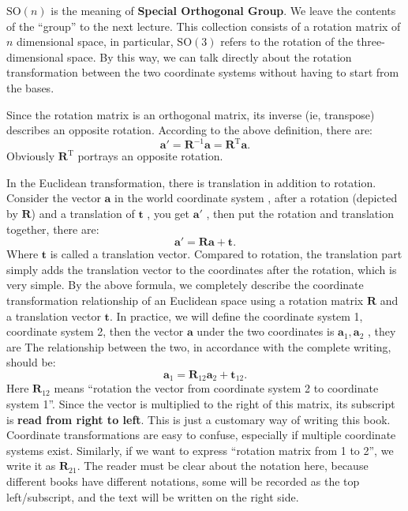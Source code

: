 $\mathrm{SO}(n) $ is the meaning of \textbf {Special Orthogonal Group}. We leave the contents of the ``group'' to the next lecture. This collection consists of a rotation matrix of $ n $ dimensional space, in particular, $\mathrm {SO}(3)$ refers to the rotation of the three-dimensional space. By this way, we can talk directly about the rotation transformation between the two coordinate systems without having to start from the bases.

Since the rotation matrix is an orthogonal matrix, its inverse (ie, transpose) describes an opposite rotation. According to the above definition, there are:
\begin{equation}
\mathbf{a} '= \mathbf{R}^{-1} \mathbf{a} = \mathbf{R}^ \mathrm{T} \mathbf{a}.
\end{equation}
Obviously $ \mathbf{R}^\mathrm{T} $ portrays an opposite rotation.

In the Euclidean transformation, there is translation in addition to rotation. Consider the vector $ \mathbf{a} $ in the world coordinate system , after a rotation (depicted by $ \mathbf{R} $) and a translation of $ \mathbf{t} $ , you get $ \mathbf{a}' $ , then put the rotation and translation together, there are:
\begin{equation}
\label{eq:RT}
\mathbf{a} '= \mathbf{R} \mathbf{a} + \mathbf{t}.
\end{equation}
Where $ \mathbf{t} $ is called a translation vector. Compared to rotation, the translation part simply adds the translation vector to the coordinates after the rotation, which is very simple. By the above formula, we completely describe the coordinate transformation relationship of an Euclidean space using a rotation matrix $ \mathbf{R} $ and a translation vector $ \mathbf{t}$. In practice, we will define the coordinate system 1, coordinate system 2, then the vector $ \mathbf{a} $ under the two coordinates is $ \mathbf{a}_1 , \mathbf{a}_2 $ , they are The relationship between the two, in accordance with the complete writing, should be:
\begin{equation}
\mathbf{a}_1 = \mathbf{R}_{12} \mathbf{a}_2 + \mathbf{t}_{12}.
\end{equation}
Here $ \mathbf{R}_{12} $ means ``rotation the vector from coordinate system 2 to coordinate system 1''. Since the vector is multiplied to the right of this matrix, its subscript is \textbf{read from right to left}. This is just a customary way of writing this book. Coordinate transformations are easy to confuse, especially if multiple coordinate systems exist. Similarly, if we want to express ``rotation matrix from 1 to 2'', we write it as $ \mathbf{R}_{21}$. The reader must be clear about the notation here, because different books have different notations, some will be recorded as the top left/subscript, and the text will be written on the right side.

